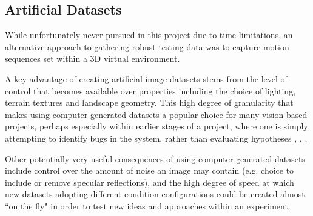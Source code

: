 %
%
%
%
%


\subsection{Artificial Datasets}

While unfortunately never pursued in this project due to time limitations, an alternative approach to gathering robust testing data was to capture motion sequences set within a 3D virtual environment. 

A key advantage of creating artificial image datasets stems from the level of control that becomes available over properties including the choice of lighting, terrain textures and landscape geometry. This high degree of granularity that makes using computer-generated datasets a popular choice for many vision-based projects, perhaps especially within earlier stages of a project, where one is simply attempting to identify bugs in the system, rather than evaluating hypotheses \cite{ucl-dataset}, \cite{baker-dataset}, \cite{mpi-dataset}.
 
Other potentially very useful consequences of using computer-generated datasets include control over the amount of noise an image may contain (e.g. choice to include or remove specular reflections), and the high degree of speed at which new datasets adopting different condition configurations could be created almost ``on the fly" in order to test new ideas and approaches within an experiment. 

